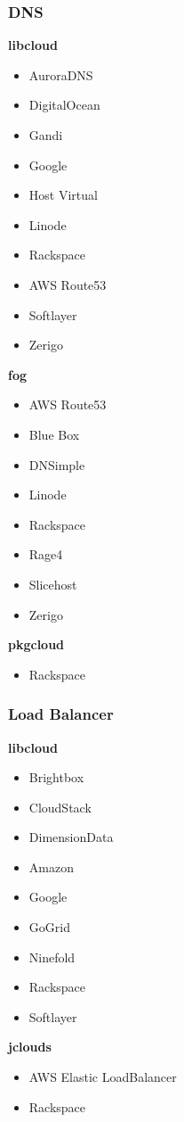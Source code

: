 \subsubsection{DNS}
\textbf{libcloud}
\begin{itemize}
\item AuroraDNS
\item DigitalOcean
\item Gandi
\item Google
\item Host Virtual
\item Linode
\item Rackspace
\item AWS Route53
\item Softlayer
\item Zerigo
\end{itemize}

\textbf{fog}
\begin{itemize}
\item AWS Route53
\item Blue Box
\item DNSimple
\item Linode
\item Rackspace
\item Rage4
\item Slicehost
\item Zerigo
\end{itemize}

\textbf{pkgcloud}
\begin{itemize}
\item Rackspace
\end{itemize}

\subsubsection{Load Balancer}
\textbf{libcloud}
\begin{itemize}
\item Brightbox
\item CloudStack
\item DimensionData
\item Amazon
\item Google
\item GoGrid
\item Ninefold
\item Rackspace
\item Softlayer
\end{itemize}

\textbf{jclouds}
\begin{itemize}
\item AWS Elastic LoadBalancer
\item Rackspace
\end{itemize}

